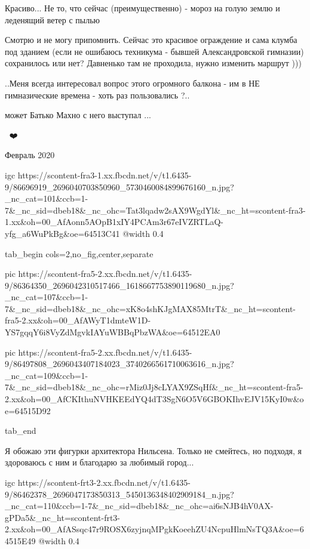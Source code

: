  
 
 
 
 

\qqSecCmt


Красиво... Не то, что сейчас (преимущественно) - мороз на голую землю и леденящий ветер с пылью


Смотрю и не могу припомнить. Сейчас это красивое ограждение и сама клумба под
зданием (если не ошибаюсь техникума - бывшей Александровской гимназии)
сохранилось или нет? Давненько там не проходила, нужно изменить маршрут )))


..Меня всегда интересовал вопрос этого огромного балкона - им в НЕ
гимназические времена - хоть раз пользовались ?..

\begin{itemize} %
может Батько Махно с него выступал ...
\end{itemize} %

👏💯❤️

Февраль 2020

\ifcmt
  igc https://scontent-fra3-1.xx.fbcdn.net/v/t1.6435-9/86696919_2696040703850960_5730460084899676160_n.jpg?_nc_cat=101&ccb=1-7&_nc_sid=dbeb18&_nc_ohc=Tat3lqadw2sAX9WgdYl&_nc_ht=scontent-fra3-1.xx&oh=00_AfAonn5AOpB1xIY4PCAm3r67eIVZRTLaQ-yfg_a6WuPkBg&oe=64513C41
	@width 0.4
\fi


\ifcmt
  tab_begin cols=2,no_fig,center,separate

     pic https://scontent-fra5-2.xx.fbcdn.net/v/t1.6435-9/86364350_2696042310517466_1618667753890119680_n.jpg?_nc_cat=107&ccb=1-7&_nc_sid=dbeb18&_nc_ohc=xK8o4shKJgMAX85MtrT&_nc_ht=scontent-fra5-2.xx&oh=00_AfAWyT1dmteW1D-YS7gqqY6i8VyZdMgvkIAYuWBBqPbzWA&oe=64512EA0

     pic https://scontent-fra5-2.xx.fbcdn.net/v/t1.6435-9/86497808_2696043407184023_3740266561710063616_n.jpg?_nc_cat=109&ccb=1-7&_nc_sid=dbeb18&_nc_ohc=rMiz0Jj8cLYAX9ZSqHf&_nc_ht=scontent-fra5-2.xx&oh=00_AfCKIthuNVHKEEdYQ4dT3SgN6O5V6GBOKIhvEJV15KyI0w&oe=64515D92

  tab_end
\fi


Я обожаю эти фигурки архитектора Нильсена. Только не смейтесь, но подходя, я
здороваюсь с ним и благодарю за любимый город...

\ifcmt
  igc https://scontent-frt3-2.xx.fbcdn.net/v/t1.6435-9/86462378_2696047173850313_5450136348402909184_n.jpg?_nc_cat=110&ccb=1-7&_nc_sid=dbeb18&_nc_ohc=ai6sNJB4hV0AX-gPDa5&_nc_ht=scontent-frt3-2.xx&oh=00_AfASsqc47r9ROSX6zyjnqMPgkKoeehZU4NcpuHlmNsTQ3A&oe=64515E49
	@width 0.4
\fi
